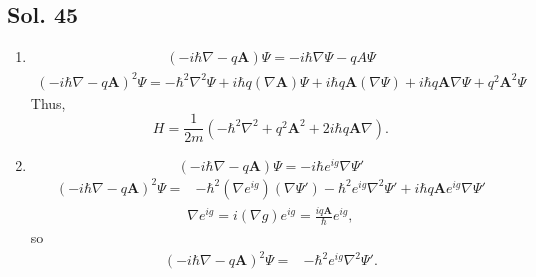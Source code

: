        \subsection*{Sol. 45}
       \begin{enumerate}
           \item 
           \begin{align*}
               (-i\hbar\nabla-q\bm A)\Psi 
               =-i\hbar\nabla \Psi - qA\Psi
           \end{align*}
           \begin{align*}
               (-i\hbar\nabla-q\bm A)^2\Psi 
               =-\hbar^2\nabla^2\Psi + i\hbar q(\nabla\bm A)\Psi + i\hbar q\bm A(\nabla \Psi)
               +i\hbar q\bm A\nabla\Psi + q^2\bm A^2\Psi
           \end{align*}
           Thus, 
           $$
           H = \frac{1}{2m}(-\hbar^2\nabla^2 + q^2\bm A^2 + 2i\hbar q\bm A\nabla).
           $$
           \item 
           $$
           (-i\hbar\nabla - q\bm A)\Psi = -i\hbar e^{ig}\nabla\Psi'
           $$
           \begin{align*}
               (-i\hbar\nabla - q\bm A)^2\Psi =& -\hbar^2
           (\nabla e^{ig})(\nabla\Psi')
           -\hbar^2e^{ig}\nabla^2\Psi'+i\hbar q\bm Ae^{ig}\nabla\Psi'
           \end{align*}
           \begin{align*}
               \nabla e^{ig}=i(\nabla g)e^{ig}=\frac{iq\bm A}{\hbar}e^{ig},
           \end{align*}
           so
           \begin{align*}
               (-i\hbar\nabla - q\bm A)^2\Psi =& 
           -\hbar^2e^{ig}\nabla^2\Psi'.
           \end{align*}
       \end{enumerate}
